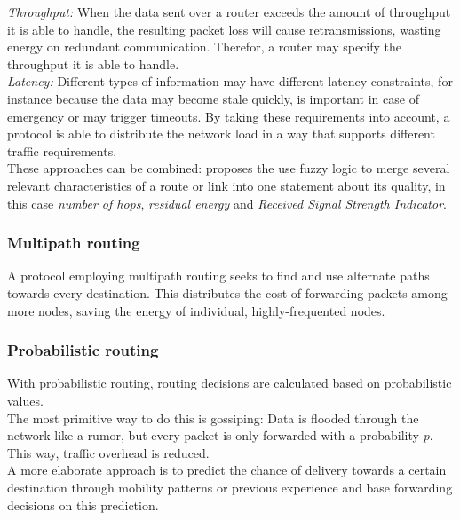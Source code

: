 \emph{Throughput:} When the data sent over a router exceeds the amount of throughput it is able to handle, the resulting packet loss will cause retransmissions, wasting energy on redundant communication. Therefor, a router may specify the throughput it is able to handle.\\
\emph{Latency:} Different types of information may have different latency constraints, for instance because the data may become stale quickly, is important in case of emergency or may trigger timeouts. By taking these requirements into account, a protocol is able to distribute the network load in a way that supports different traffic requirements.\\
These approaches can be combined: \cite{fuzzymetrics} proposes the use fuzzy logic %
to merge several relevant characteristics of a route or link into one statement about its quality, in this case \emph{number of hops}, \emph{residual energy} and \emph{Received Signal Strength Indicator}.%


\subsubsection{Multipath routing}
\label{subsec:appr_mechanisms_multipath}
A protocol employing multipath routing seeks to find and use alternate paths towards every destination. This distributes the cost of forwarding packets among more nodes, saving the energy of individual, highly-frequented nodes. %
\cite{wsn_survey}

\subsubsection{Probabilistic routing}
\label{subsec:appr_char_probabilistic}
With probabilistic routing, routing decisions are calculated based on probabilistic values.\\
The most primitive way to do this is gossiping: Data is flooded through the network like a rumor, but every packet is only forwarded with a probability \emph{p}. This way, traffic overhead is reduced.\\
A more elaborate approach is to predict the chance of delivery towards a certain destination through mobility patterns or previous experience and base forwarding decisions on this prediction.
